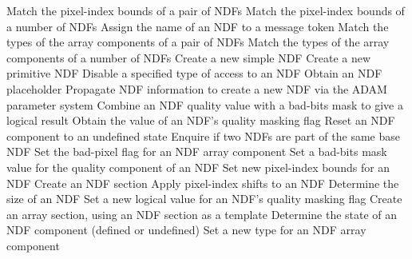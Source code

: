 {\begin{description}{\addtolength{\itemindent}{-8mm}}
            {Match the pixel-index bounds of a pair of NDFs}
            {Match the pixel-index bounds of a number of NDFs}
            {Assign the name of an NDF to a message token}
            {Match the types of the array components of a pair of NDFs}
            {Match the types of the array components of a number of NDFs}
            {Create a new simple NDF}
            {Create a new primitive NDF}
            {Disable a specified type of access to an NDF}
            {Obtain an NDF placeholder}
            {Propagate NDF information to create a new NDF via the ADAM parameter system}
            {Combine an NDF quality value with a bad-bits mask to give a logical result}
            {Obtain the value of an NDF's quality masking flag}
            {Reset an NDF component to an undefined state}
            {Enquire if two NDFs are part of the same base NDF}
            {Set the bad-pixel flag for an NDF array component}
            {Set a bad-bits mask value for the quality component of an NDF}
            {Set new pixel-index bounds for an NDF}
            {Create an NDF section}
            {Apply pixel-index shifts to an NDF}
            {Determine the size of an NDF}
            {Set a new logical value for an NDF's quality masking flag}
            {Create an array section, using an NDF section as a template}
            {Determine the state of an NDF component (defined or undefined)}
            {Set a new type for an NDF array component}

\end{description}}
